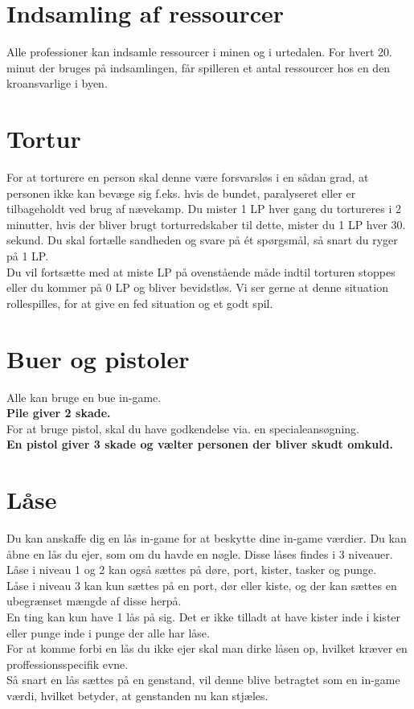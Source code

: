 \section{Indsamling af ressourcer}
Alle professioner kan indsamle ressourcer i minen og i urtedalen. For hvert 20. minut der bruges på indsamlingen, får spilleren et antal ressourcer hos en den kroansvarlige i byen.

\section{Tortur}
For at torturere en person skal denne være forsvarsløs i en sådan grad, at personen ikke kan bevæge sig f.eks. hvis de bundet, paralyseret eller er tilbageholdt ved brug af nævekamp.
Du mister 1 LP hver gang du tortureres i 2 minutter, hvis der bliver brugt torturredskaber til dette, mister du 1 LP hver 30. sekund.
Du skal fortælle sandheden og svare på ét spørgsmål, så snart du ryger på 1 LP.\\
Du vil fortsætte med at miste LP på ovenstående måde indtil torturen stoppes eller du kommer på 0 LP og bliver bevidstløs. Vi ser gerne at denne situation rollespilles, for at give en fed situation og et godt spil.

\section{Buer og pistoler}
Alle kan bruge en bue in-game.\\
\textbf{Pile giver 2 skade.}\\
For at bruge pistol, skal du have godkendelse via. en specialeansøgning.\\ 
\textbf{En pistol giver 3 skade og vælter personen der bliver skudt omkuld.}

\section{Låse}
Du kan anskaffe dig en lås in-game for at beskytte dine in-game værdier. Du kan åbne en lås du ejer, som om du havde en nøgle. Disse låses findes i 3 niveauer.\\
Låse i niveau 1 og 2 kan også sættes på døre, port, kister, tasker og punge.\\
Låse i niveau 3 kan kun sættes på en port, dør eller kiste, og der kan sættes en ubegrænset mængde af disse herpå.\\
En ting kan kun have 1 lås på sig. Det er ikke tilladt at have kister inde i kister eller punge inde i punge der alle har låse.\\
For at komme forbi en lås du ikke ejer skal man dirke låsen op, hvilket kræver en proffessionsspecifik evne.\\
Så snart en lås sættes på en genstand, vil denne blive betragtet som en in-game værdi, hvilket betyder, at genstanden nu kan stjæles.


